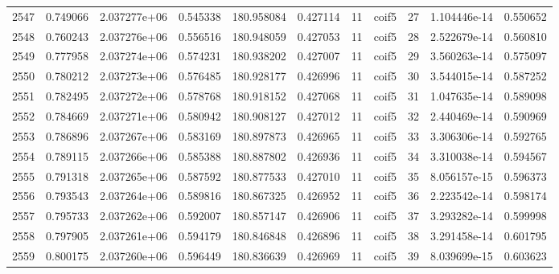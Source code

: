 \begin{tabular}{lrrrrrrlrrr}
2547 &    0.749066 &        2.037277e+06 &  0.545338 &              180.958084 &    0.427114 &      11 &        coif5 &     27 &   1.104446e-14 &      0.550652 \\
2548 &    0.760243 &        2.037276e+06 &  0.556516 &              180.948059 &    0.427053 &      11 &        coif5 &     28 &   2.522679e-14 &      0.560810 \\
2549 &    0.777958 &        2.037274e+06 &  0.574231 &              180.938202 &    0.427007 &      11 &        coif5 &     29 &   3.560263e-14 &      0.575097 \\
2550 &    0.780212 &        2.037273e+06 &  0.576485 &              180.928177 &    0.426996 &      11 &        coif5 &     30 &   3.544015e-14 &      0.587252 \\
2551 &    0.782495 &        2.037272e+06 &  0.578768 &              180.918152 &    0.427068 &      11 &        coif5 &     31 &   1.047635e-14 &      0.589098 \\
2552 &    0.784669 &        2.037271e+06 &  0.580942 &              180.908127 &    0.427012 &      11 &        coif5 &     32 &   2.440469e-14 &      0.590969 \\
2553 &    0.786896 &        2.037267e+06 &  0.583169 &              180.897873 &    0.426965 &      11 &        coif5 &     33 &   3.306306e-14 &      0.592765 \\
2554 &    0.789115 &        2.037266e+06 &  0.585388 &              180.887802 &    0.426936 &      11 &        coif5 &     34 &   3.310038e-14 &      0.594567 \\
2555 &    0.791318 &        2.037265e+06 &  0.587592 &              180.877533 &    0.427010 &      11 &        coif5 &     35 &   8.056157e-15 &      0.596373 \\
2556 &    0.793543 &        2.037264e+06 &  0.589816 &              180.867325 &    0.426952 &      11 &        coif5 &     36 &   2.223542e-14 &      0.598174 \\
2557 &    0.795733 &        2.037262e+06 &  0.592007 &              180.857147 &    0.426906 &      11 &        coif5 &     37 &   3.293282e-14 &      0.599998 \\
2558 &    0.797905 &        2.037261e+06 &  0.594179 &              180.846848 &    0.426896 &      11 &        coif5 &     38 &   3.291458e-14 &      0.601795 \\
2559 &    0.800175 &        2.037260e+06 &  0.596449 &              180.836639 &    0.426969 &      11 &        coif5 &     39 &   8.039699e-15 &      0.603623 \\

\end{tabular}
